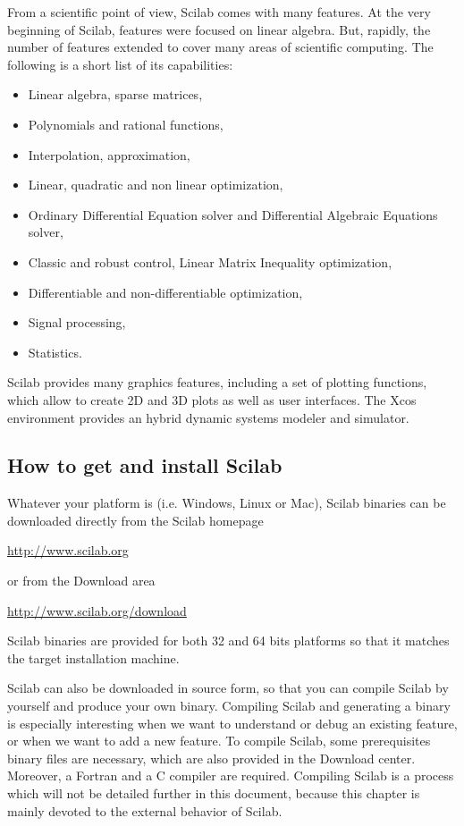 From a scientific point of view, Scilab comes with many features. 
At the very beginning of Scilab, features were focused on linear algebra.
But, rapidly, the number of features extended to cover many areas of 
scientific computing. 
The following is a short list of its capabilities:
    \begin{itemize}
    \item Linear algebra, sparse matrices,
    \item Polynomials and rational functions,
    \item Interpolation, approximation,
    \item Linear, quadratic and non linear optimization,
    \item Ordinary Differential Equation solver and Differential Algebraic Equations solver,
    \item Classic and robust control, Linear Matrix Inequality optimization,
    \item Differentiable and non-differentiable optimization,
    \item Signal processing,
    \item Statistics.
    \end{itemize}

Scilab provides many graphics features, including a set 
of plotting functions, which allow to create 2D and 3D plots as well 
as user interfaces.
The Xcos environment provides an hybrid dynamic systems modeler and simulator.

\subsection{How to get and install Scilab}
\label{introscilab-getinstalscilab}

Whatever your platform is (i.e. Windows, Linux or Mac), Scilab
binaries can be downloaded directly from the Scilab homepage 
\begin{center}
\url{http://www.scilab.org}
\end{center}

or from the Download area 
\begin{center}
\url{http://www.scilab.org/download}
\end{center}

Scilab binaries are provided for both 32 and 64 bits platforms so that it 
matches the target installation machine.

Scilab can also be downloaded in source form, so that you can 
compile Scilab by yourself and produce your own binary. 
Compiling Scilab and generating a binary is especially interesting
when we want to understand or debug an existing feature, or when 
we want to add a new feature.
To compile Scilab, some prerequisites binary files are necessary, which 
are also provided in the Download center. Moreover, a Fortran and 
a C compiler are required. Compiling Scilab is a process which 
will not be detailed further in this document, because this chapter 
is mainly devoted to the external behavior of Scilab.

